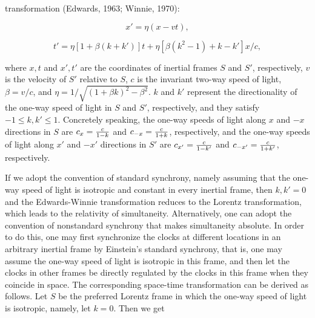 transformation (Edwards, 1963; Winnie, 1970): 

\begin{equation}
x'=\eta(x-vt),
\label{}
\end{equation}

\begin{equation}
t'=\eta[1+\beta (k+k')]t+\eta [\beta (k^2-1)+k-k']x/c,
\label{}
\end{equation}

\noindent where $x,t$ and $x',t'$ are the coordinates of inertial frames $S$ and $S'$, respectively, $v$ is the velocity of $S'$ relative to $S$, $c$ is the invariant two-way speed of light, $\beta=v/c$, and $\eta=1/\sqrt{(1+\beta k)^2-\beta^2}$. $k$ and $k'$ represent the directionality of the one-way  speed of light in $S$ and $S'$, respectively, and they satisfy $-1 \leqslant  k, k' \leqslant 1$. Concretely speaking, the one-way  speeds of light along $x$ and $-x$  directions in $S$ are $c_x={c \over {1-k}}$ and $c_{-x}={c \over {1+k}}$, respectively, and the one-way  speeds of light along $x'$ and $-x'$ directions in $S'$ are $c_{x'}={c \over {1-k'}}$ and $c_{-x'}={c \over {1+k'}}$, respectively. 

If we adopt the convention of standard synchrony, namely assuming that the one-way speed of light is isotropic and constant in every inertial frame, then $k,k' =0$ and the Edwards-Winnie transformation  reduces to the Lorentz transformation, which leads to the relativity of simultaneity. Alternatively, one can  adopt the convention of nonstandard synchrony that makes simultaneity absolute. In order to do this, one may first synchronize the clocks at different locations in an arbitrary inertial frame by Einstein's standard synchrony, that is, one may assume the one-way speed of light is isotropic in this frame, and then let the clocks in other frames be directly regulated by the clocks in this frame when they coincide in space. The corresponding space-time transformation can be derived as follows. Let $S$ be the preferred Lorentz frame in which the one-way speed of light is isotropic, namely, let $k = 0$. Then we get

